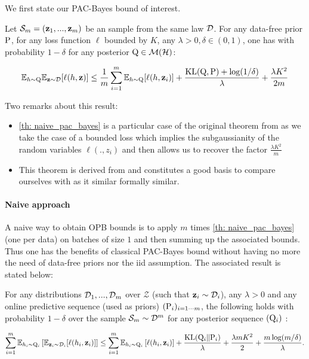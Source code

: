 We first state our PAC-Bayes bound of interest.

\begin{theorem}
  \label{th: naive_pac_bayes}
  Let $\Sm=(\z_1,...,\z_m)$ be an \iid sample from the same law $\D$.
  For any data-free prior $\P$, for any loss function $\ell$ bounded by $K$, any $\lambda>0,\delta\in (0,1)$, one has with probability $1-\delta$ for any posterior $\Q\in\mathcal{M}(\mathcal{H})$:

  \[ \mathbb{E}_{h\sim \Q}\mathbb{E}_{\z\sim \D}[\ell(h,\z)] \leq \frac{1}{m} \sum_{i=1}^m \mathbb{E}_{h\sim \Q}[\ell(h,\z_i)] + \frac{\operatorname{KL}(\Q,\P) + \log(1/\delta)}{\lambda} + \frac{\lambda K^2}{2m} \]
\end{theorem}

\begin{remark} Two remarks about this result:


  \begin{itemize}
    \item \cref{th: naive_pac_bayes} is a particular case of the original theorem from \cite{alquier2016properties} as we take the case of a bounded loss which implies the subgaussianity of the random variables $\ell(.,z_i)$ and then allows us to recover the factor $\frac{\lambda K^2}{m}$
    \item This theorem is derived from \cite{catoni2007pac} and constitutes a good basis to compare ourselves with as it similar formally similar.
  \end{itemize}
\end{remark}


\paragraph{Naive approach} A naive way to obtain OPB bounds is to apply $m$ times \cref{th: naive_pac_bayes} (one per data) on batches of size $1$ and then summing up the associated bounds. Thus one has the benefits of classical PAC-Bayes bound without having no more the need of data-free priors nor the iid assumption. The associated result is stated below:

\begin{theorem}
  \label{th: naive_approach}
  For any distributions $\D_1,...,\D_m$ over $\mathcal{Z}$ (such that $\z_i\sim \D_i$), any $\lambda>0$ and any online predictive sequence (used as priors) $(\P_{i})_{i=1\cdots m}$, the following holds with probability $1-\delta$ over the sample $\Sm\sim\D^m$ for any posterior sequence $(\Q_{i})$ :


  \begin{align*}
    \sum_{i=1}^m \mathbb{E}_{h_i\sim \Q_{i}}\left[ \mathbb{E}_{\z_i\sim \D_i}[\ell(h_i,\z_i)]    \right] \leq \sum_{i=1}^m \mathbb{E}_{h_i\sim \Q_{i}}\left[ \ell(h_i,\z_i) \right] +
    \frac{\operatorname{KL}(\Q_{i}\| \P_{i})}{\lambda} + \frac{\lambda m K^2}{2} + \frac{m\log(m/\delta)}{\lambda}.
  \end{align*}
\end{theorem}

